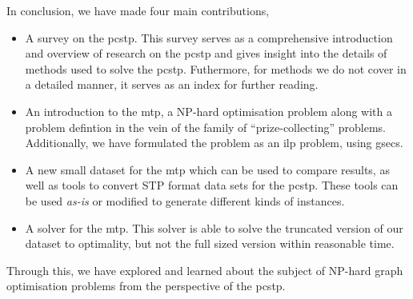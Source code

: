 In conclusion, we have made four main contributions,
\begin{itemize}
\item A survey on the \gls{pcstp}. This survey serves as a comprehensive introduction
  and overview of research on the \gls{pcstp} and gives insight into the details of
  methods used to solve the \gls{pcstp}. Futhermore, for methods we do not cover
  in a detailed manner, it serves as an index for further reading.
\item An introduction to the \acrlong{mtp}, a NP-hard optimisation problem along with
  a problem defintion in the vein of the family of ``prize-collecting'' problems.
  Additionally, we have formulated the problem as an \gls{ilp} problem, using \glspl{gsec}.
\item A new small dataset for the \gls{mtp} which can be used to compare results, as well
  as tools to convert STP format data sets for the \gls{pcstp}. These tools can be used
  \textit{as-is} or modified to generate different kinds of instances.
\item A solver for the \gls{mtp}. This solver is able to solve the truncated version of
  our dataset to optimality, but not the full sized version within reasonable time.
\end{itemize}

Through this, we have explored and learned about the subject of
NP-hard graph optimisation problems from
the perspective of the \acrlong{pcstp}.



